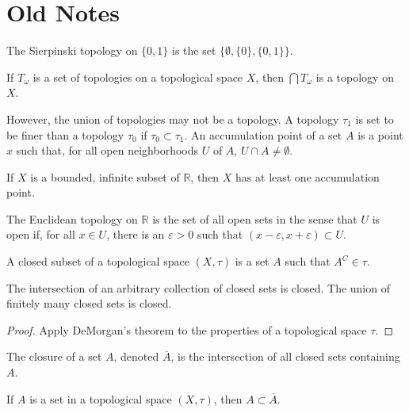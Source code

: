     \section{Old Notes}
    \begin{example}
        The Sierpinski topology
        on $\{0,1\}$ is the set
        $\{\emptyset,\{0\},\{0,1\}\}$.
    \end{example}
    \begin{theorem}
        If $T_{\omega}$ is a set of topologies on
        a topological space $X$, then
        $\bigcap{T_{\omega}}$ is a topology on $X$.
    \end{theorem}
    However, the union of topologies may not be a
    topology. A topology $\tau_{1}$ is set to
    be finer than a topology $\tau_{0}$ if
    $\tau_{0}\subset\tau_{1}$. An accumulation point
    of a set $A$ is a point $x$ such that, for
    all open neighborhoods $U$ of $A$,
    $U\cap{A}\ne\emptyset$.
    \begin{theorem}
        If $X$ is a bounded, infinite subset of
        $\mathbb{R}$, then $X$ has at least
        one accumulation point.
    \end{theorem}
    \begin{definition}
        The Euclidean topology on
        $\mathbb{R}$ is the set of
        all open sets in the sense that
        $U$ is open if, for all $x\in{U}$,
        there is an $\varepsilon>0$ such
        that $(x-\varepsilon,x+\varepsilon)\subset{U}$.
    \end{definition}
    \begin{definition}
        A closed subset of a topological space
        $(X,\tau)$ is a set $A$ such that
        $A^{C}\in\tau$.
    \end{definition}
    \begin{theorem}
        The intersection of an arbitrary collection of
        closed sets is closed. The union of finitely
        many closed sets is closed.
    \end{theorem}
    \begin{proof}
        Apply DeMorgan's theorem to the properties
        of a topological space $\tau$.
    \end{proof}
    \begin{definition}
        The closure of a set $A$,
        denoted $\overline{A}$, is the
        intersection of all closed sets
        containing $A$.
    \end{definition}
    \begin{theorem}
        If $A$ is a set in a topological space
        $(X,\tau)$, then $A\subset\overline{A}$.
    \end{theorem}
